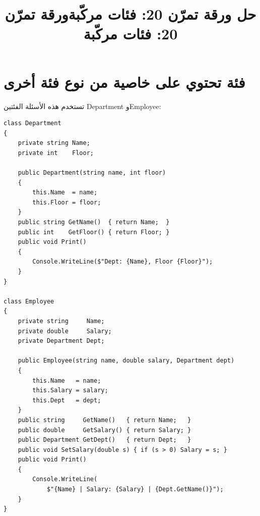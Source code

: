 \documentclass[14pt]{extarticle}
\title{حل ورقة تمرّن 20: فئات مركّبة}
\title{ورقة تمرّن 20: فئات مركّبة}
\begin{document}
\maketitle
\thispagestyle{fancy}

\section{فئة تحتوي على خاصية من نوع فئة أخرى}

تستخدم هذه الأسئلة الفئتين \textenglish{Department} و\textenglish{Employee}:

\begin{boxExample}
\begin{english}
{\small
\begin{verbatim}
class Department
{
    private string Name;
    private int    Floor;

    public Department(string name, int floor)
    {
        this.Name  = name;
        this.Floor = floor;
    }
    public string GetName()  { return Name;  }
    public int    GetFloor() { return Floor; }
    public void Print()
    {
        Console.WriteLine($"Dept: {Name}, Floor {Floor}");
    }
}

class Employee
{
    private string     Name;
    private double     Salary;
    private Department Dept;

    public Employee(string name, double salary, Department dept)
    {
        this.Name   = name;
        this.Salary = salary;
        this.Dept   = dept;
    }
    public string     GetName()   { return Name;   }
    public double     GetSalary() { return Salary; }
    public Department GetDept()   { return Dept;   }
    public void SetSalary(double s) { if (s > 0) Salary = s; }
    public void Print()
    {
        Console.WriteLine(
            $"{Name} | Salary: {Salary} | {Dept.GetName()}");
    }
}
\end{verbatim}
}
\end{english}
\end{boxExample}
\end{document}
